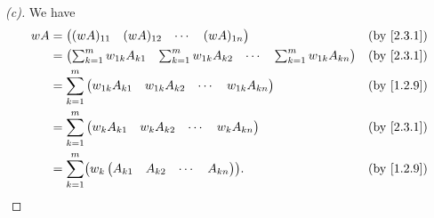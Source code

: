 \begin{proof}[(c)]
	We have
	\begin{align*}
		wA & = \begin{pmatrix}
			       (wA)_{1 1} & (wA)_{1 2} & \cdots & (wA)_{1 n}
		       \end{pmatrix}                                                             &  & \by{2.3.1}                                \\
		   & = \begin{pmatrix}
			       \sum_{k = 1}^m w_{1 k} A_{k 1} & \sum_{k = 1}^m w_{1 k} A_{k 2} & \cdots & \sum_{k = 1}^m w_{1 k} A_{k n}
		       \end{pmatrix} &  & \by{2.3.1}                \\
		   & = \sum_{k = 1}^m \begin{pmatrix}
			                      w_{1 k} A_{k 1} & w_{1 k} A_{k 2} & \cdots & w_{1 k} A_{k n}
		                      \end{pmatrix}                                              &  & \by{1.2.9}                                \\
		   & = \sum_{k = 1}^m \begin{pmatrix}
			                      w_k A_{k 1} & w_k A_{k 2} & \cdots & w_k A_{k n}
		                      \end{pmatrix}                                                          &  & \by{2.3.1}                    \\
		   & = \sum_{k = 1}^m \pa{w_k \begin{pmatrix}
				                              A_{k 1} & A_{k 2} & \cdots & A_{k n}
			                              \end{pmatrix}}.                                                                   &  & \by{1.2.9} \\
	\end{align*}
\end{proof}

